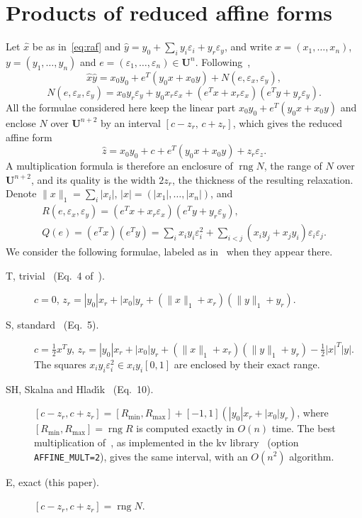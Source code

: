 \documentclass[10pt]{article}
\theoremstyle{definition}
\newcommand{\U}{\mathbf{U}}
\newcommand{\eps}{\varepsilon}
\newcommand{\ex}{\eps_x}
\newcommand{\ey}{\eps_y}
\newcommand{\rng}{\operatorname{rng}}
\begin{document}
\section{Products of reduced affine forms}
\label{sec:products}

Let $\hat x$ be as in~\eqref{eq:raf} and $\hat y = y_0+\sum_i y_i\eps_i + y_r\ey$, and write $x=(x_1,\dots,x_n)$, $y=(y_1,\dots,y_n)$ and $e=(\eps_1,\dots,\eps_n)\in\U^n$. Following~\cite{skalna2017new},
\begin{equation}
\label{eq:product}
\hat x\hat y = x_0y_0 + e^T(y_0x+x_0y) + N(e,\ex,\ey),
\end{equation}
\begin{equation}
\label{eq:N}
N(e,\ex,\ey) = x_0y_r\ey + y_0x_r\ex + (e^Tx + x_r\ex)(e^Ty + y_r\ey).
\end{equation}
All the formulae considered here keep the linear part $x_0y_0+e^T(y_0x+x_0y)$ and enclose $N$ over $\U^{n+2}$ by an interval $[c-z_r,\,c+z_r]$, which gives the reduced affine form
\begin{equation}
\label{eq:zhat}
\hat z = x_0y_0 + c + e^T(y_0x+x_0y) + z_r\eps_z .
\end{equation}
A multiplication formula is therefore an enclosure of $\rng N$, the range of $N$ over $\U^{n+2}$, and its quality is the width $2z_r$, the thickness of the resulting relaxation. Denote $\|x\|_1=\sum_i|x_i|$, $|x|=(|x_1|,\dots,|x_n|)$, and
\[
\begin{gathered}R(e,\ex,\ey) = (e^Tx + x_r\ex)(e^Ty + y_r\ey),\\ Q(e) = (e^Tx)(e^Ty) = \sum_i x_iy_i\eps_i^2 + \sum_{i<j}(x_iy_j+x_jy_i)\eps_i\eps_j .\end{gathered}
\]
We consider the following formulae, labeled as in~\cite{skalna2017new} when they appear there.
\begin{description}
\item[T, trivial~\cite{stolfi1997self} (Eq.~4 of~\cite{skalna2017new}).] $c=0$, $z_r = |y_0|x_r+|x_0|y_r+(\|x\|_1+x_r)(\|y\|_1+y_r)$.
\item[S, standard~\cite{kolev2004improved,vu2009enhancing} (Eq.~5).] $c=\tfrac12 x^Ty$, $z_r = |y_0|x_r+|x_0|y_r+(\|x\|_1+x_r)(\|y\|_1+y_r) - \tfrac12|x|^T|y|$. The squares $x_iy_i\eps_i^2\in x_iy_i[0,1]$ are enclosed by their exact range.
\item[SH, Skalna and Hlad\'{\i}k~\cite{skalna2017new} (Eq.~10).] $[c-z_r,c+z_r] = [R_{\min},R_{\max}] + [-1,1](|y_0|x_r+|x_0|y_r)$, where $[R_{\min},R_{\max}]=\rng R$ is computed exactly in $O(n)$ time. The best multiplication of~\cite{miyajima2003best}, as implemented in the kv library~\cite{kvlib} (option \texttt{AFFINE\_MULT=2}), gives the same interval, with an $O(n^2)$ algorithm.
\item[E, exact (this paper).] $[c-z_r,c+z_r]=\rng N$.
\end{description}
\end{document}
